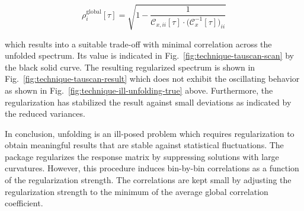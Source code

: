 \begin{equation}
\rho^\mathrm{global}_{ i}[\tau]=\sqrt{1-\frac{1}{\mathcal{C}_{x,ii}[\tau]\cdot\big(\mathcal{C}_{x}^{-1}[\tau]\big)_{ii}}}\label{eq:technique-global-correlation}
\end{equation}

which results into a suitable trade-off with minimal correlation across the unfolded spectrum. Its value is indicated in Fig.~\ref{fig:technique-tauscan-scan} by the black solid curve. The resulting regularized spectrum is shown in Fig.~\ref{fig:technique-tauscan-result} which does not exhibit the oscillating behavior as shown in Fig.~\ref{fig:technique-ill-unfolding-true} above. Furthermore, the regularization has stabilized the result against small deviations as indicated by the reduced variances.



In conclusion, unfolding is an ill-posed problem which requires regularization to obtain meaningful results that are stable against statistical fluctuations. The \TUNFOLD package regularizes the response matrix by suppressing solutions with large curvatures. However, this procedure induces bin-by-bin correlations as a function of the regularization strength. The correlations are kept small by adjusting the regularization strength to the minimum of the average global correlation coefficient.

